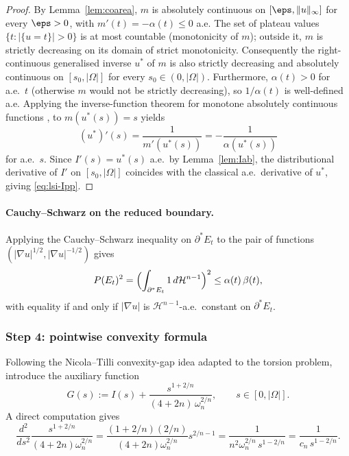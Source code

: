 \begin{proof}
By Lemma~\ref{lem:coarea}, $m$ is absolutely continuous on
$[\eps,\|u\|_{\infty}]$ for every $\eps>0$, with $m'(t)=-\alpha(t)\le 0$
a.e. The set of plateau values $\{t:|\{u=t\}|>0\}$ is at most countable
(monotonicity of $m$); outside it, $m$ is strictly decreasing on its
domain of strict monotonicity. Consequently the right-continuous
generalised inverse $u^{*}$ of $m$ is also strictly decreasing and
absolutely continuous on $[s_{0},|\Omega|]$ for every $s_{0}\in
(0,|\Omega|)$. Furthermore, $\alpha(t)>0$ for a.e.\ $t$ (otherwise $m$
would not be strictly decreasing), so $1/\alpha(t)$ is well-defined
a.e. Applying the inverse-function theorem for monotone absolutely
continuous functions \cite[Theorem 3.99]{AFP2000},
\cite[Lemma 1.4]{BBC1975} to $m(u^{*}(s))=s$ yields
\[
   (u^{*})'(s)=\frac{1}{m'(u^{*}(s))}=-\frac{1}{\alpha(u^{*}(s))}
\]
for a.e.\ $s$. Since $I'(s)=u^{*}(s)$ a.e.\ by Lemma~\ref{lem:Iab}, the
distributional derivative of $I'$ on $[s_{0},|\Omega|]$ coincides with
the classical a.e.\ derivative of $u^{*}$, giving \eqref{eq:lsi-Ipp}.
\end{proof}

\paragraph{Cauchy--Schwarz on the reduced boundary.}
Applying the Cauchy--Schwarz inequality on $\partial^{*}E_{t}$ to the
pair of functions $(|\nabla u|^{1/2},|\nabla u|^{-1/2})$ gives
\begin{equation}\label{eq:lsi-CS}
   P(E_{t})^{2}
   =\Bigl(\int_{\partial^{*}E_{t}}1\,d\mathcal H^{n-1}\Bigr)^{2}
   \le\alpha(t)\,\beta(t),
\end{equation}
with equality if and only if $|\nabla u|$ is $\mathcal H^{n-1}$-a.e.\
constant on $\partial^{*}E_{t}$.

\subsubsection{Step 4: pointwise convexity formula}
\label{sssec:lsi-Gpp}

Following the Nicola--Tilli convexity-gap idea adapted to the torsion
problem, introduce the auxiliary function
\begin{equation}\label{eq:lsi-Gdef}
   G(s):=I(s)+\frac{s^{1+2/n}}{(4+2n)\,\omega_{n}^{2/n}},
   \qquad s\in[0,|\Omega|].
\end{equation}
A direct computation gives
\[
   \frac{d^{2}}{ds^{2}}\frac{s^{1+2/n}}{(4+2n)\omega_{n}^{2/n}}
   =\frac{(1+2/n)(2/n)}{(4+2n)\omega_{n}^{2/n}}s^{2/n-1}
   =\frac{1}{n^{2}\omega_{n}^{2/n}\,s^{1-2/n}}
   =\frac{1}{c_{n}\,s^{1-2/n}}.
\]

